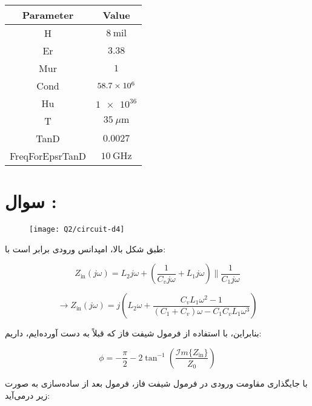 \documentclass[12pt,onecolumn,a4paper]{article}
\newcommand\question[1][\space]{
	\section[سوال \tartibi{section}]
	{سوال \tartibi{section}: #1}
}
\begin{document}
\begin{table}[h!]
	\centering
	\begin{tabular}{|c|c|}
			\hline
			\textbf{Parameter} & \textbf{Value} \\ \hline
			H & $\num{8} \ \text{mil}$ \\ \hline
			Er &$\num{3.38}$ \\ \hline
			Mur & $\num{1}$ \\ \hline
			Cond & $\num{58.7E6}$ \\ \hline
			Hu & $\num{1e+36}$ \\ \hline
			T & $\num{35} \ \text{$\mu$m}$ \\ \hline
			TanD & $\num{0.0027}$ \\ \hline
			FreqForEpsrTanD & $\num{10} \ \text{GHz}$ \\ \hline
		\end{tabular}
	\caption{}
	\label{tab:parameters}
\end{table}


\FloatBarrier\question[]%
\begin{figure}[H]
	\centering
	\texttt{[image: Q2/circuit-d4]}
	\caption{}
	\label{fig:circuit-d4}
\end{figure}

طبق شکل بالا، امپدانس ورودی برابر است با:

\begin{equation}
	Z_\text{in}(j\omega) = L_2 j\omega + \left( \frac{1}{C_v j\omega} + L_1 j\omega \right) \parallel \frac{1}{C_1 j\omega}
\end{equation}


\begin{equation}
	\rightarrow Z_\text{in}(j\omega) = j \left( L_2 \omega + \frac{C_v L_1 \omega^2 - 1}{(C_1 + C_v) \omega - C_1 C_v L_1 \omega^3} \right)
\end{equation}

بنابراین، با استفاده از فرمول شیفت فاز که قبلاً به دست آورده‌ایم، داریم:

\begin{equation}
	\phi = -\frac{\pi}{2} - 2 \tan^{-1} \left( \frac{\mathcal{I}m \{Z_\text{in}\}}{Z_0} \right)
\end{equation}

با جایگذاری مقاومت ورودی در فرمول شیفت فاز، فرمول بعد از ساده‌سازی به صورت زیر درمی‌آید:
\end{document}

